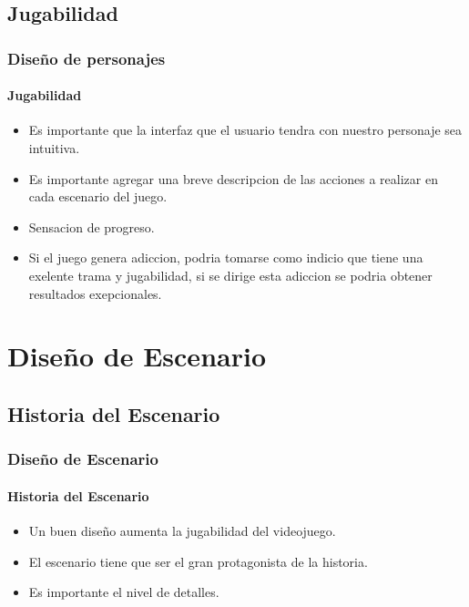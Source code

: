 \documentclass[11pt]{beamer}
\begin{document}
\subsection{Jugabilidad}
\begin{frame}

\frametitle{Diseño de personajes}
\framesubtitle{Jugabilidad}
	\begin{itemize}
	\item Es importante que la interfaz que el usuario tendra con nuestro personaje sea intuitiva.
	\item Es importante agregar una breve descripcion de las acciones a realizar en cada escenario del juego.
	\item Sensacion de progreso.
	\item Si el juego genera adiccion, podria tomarse como indicio que tiene una exelente trama y jugabilidad, si se dirige esta adiccion se podria obtener resultados exepcionales.
	\end{itemize}
\end{frame}


\section{Diseño de Escenario}
\subsection{Historia del Escenario}
\begin{frame}

\frametitle{Diseño de Escenario}
\framesubtitle{Historia del Escenario}
	\begin{itemize}
	\item Un buen diseño aumenta la jugabilidad del videojuego.
	\item El escenario tiene que ser el gran protagonista de la historia.
	\item Es importante el nivel de detalles.
	\end{itemize}
\end{frame}
\end{document}
